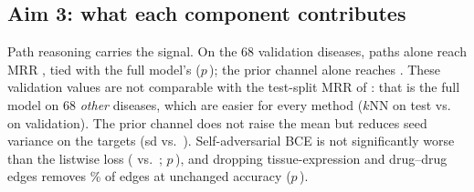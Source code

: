 \documentclass[conference]{IEEEtran}
\begin{document}
\begin{table}[t]
\centering
\caption{Aim 2: ranking of all 7,957 drugs. Any@10: diseases with a known indication in the top 10 (random \RandExpAnyTenTest\%); H@$k$: known drugs in the top $k$; random AUPRC $\approx$0.001. Test: seed means (\TestSeeds{} seeds; KG embeddings \KgeRotateSeeds).}
\label{tab:main}
\scriptsize
\setlength{\tabcolsep}{3pt}
\resizebox{\textwidth}{!}{}
\end{table}

\subsection{Aim 3: what each component contributes}
Path reasoning carries the signal. On the 68 validation diseases, paths alone reach MRR \PathsValidMrr{}, tied with the full model's \MainValidMrr{} ($p$\,\PwilMainPathsValid); the prior channel alone reaches \PriorValidMrr. These validation values are not comparable with the test-split MRR of \TestMrr{}: that is the full model on 68 \emph{other} diseases, which are easier for every method ($k$NN \KnnTestMrr{} on test vs.\ \KnnValidMrr{} on validation). The prior channel does not raise the mean but reduces seed variance on the targets (sd \MainTargetsMrrSd{} vs.\ \PathsTargetsMrrSd). Self-adversarial BCE is not significantly worse than the listwise loss (\BceValidMrr{} vs.\ \MainValidMrr; $p$\,\PwilMainBceValid), and dropping tissue-expression and drug--drug edges removes \BrgEdgeCutPct\% of edges at unchanged accuracy ($p$\,\PwilMainBrgValid).
\end{document}
